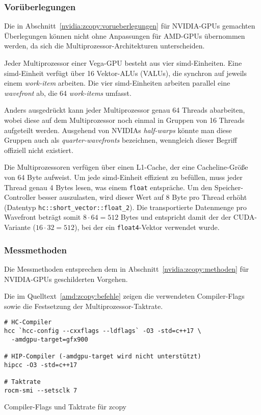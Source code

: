 \subsubsection{Vorüberlegungen}

Die in Abschnitt~\ref{nvidia:zcopy:vorueberlegungen} für NVIDIA-GPUs gemachten
Überlegungen können nicht ohne Anpassungen für AMD-GPUs übernommen werden, da
sich die Multiprozessor-Architekturen unterscheiden.

Jeder Multiprozessor einer Vega-GPU besteht aus vier \gls{simd}-Einheiten. Eine
\gls{simd}-Einheit verfügt über 16 Vektor-ALUs (VALUs), die synchron auf jeweils
einem \textit{work-item} arbeiten. Die vier \gls{simd}-Einheiten arbeiten
parallel eine \textit{wavefront} ab, die 64 \textit{work-items} umfasst.

Anders ausgedrückt kann jeder Multiprozessor genau 64 Threads abarbeiten, wobei
diese auf dem Multiprozessor noch einmal in Gruppen von 16 Threads aufgeteilt
werden. Ausgehend von NVIDIAs \textit{half-warps} könnte man diese Gruppen auch
als \textit{quarter-wavefronts} bezeichnen, wenngleich dieser Begriff offiziell
nicht existiert.

Die Multiprozessoren verfügen über einen L1-Cache, der eine Cacheline-Größe von
64 Byte aufweist. Um jede \gls{simd}-Einheit effizient zu befüllen, muss jeder
Thread genau 4 Bytes lesen, was einem \texttt{float} entspräche. Um den
Speicher-Controller besser auszulasten, wird dieser Wert auf 8 Byte pro Thread
erhöht (Datentyp \texttt{hc::short\_vector::float\_2}). Die transportierte
Datenmenge pro Wavefront beträgt somit $8 \cdot 64 = 512$ Bytes und entspricht
damit der der CUDA-Variante ($16 \cdot 32 = 512$), bei der ein
\texttt{float4}-Vektor verwendet wurde.

\subsubsection{Messmethoden}
\label{amd:zcopy:methoden}

Die Messmethoden entsprechen dem in Abschnitt~\ref{nvidia:zcopy:methoden}
für NVIDIA-GPUs geschilderten Vorgehen.

Die im Quelltext~\ref{amd:zcopy:befehle} zeigen die verwendeten Compiler-Flags
sowie die Festsetzung der Multiprozessor-Taktrate.

\begin{code}
    \begin{verbatim}
# HC-Compiler
hcc `hcc-config --cxxflags --ldflags` -O3 -std=c++17 \
  -amdgpu-target=gfx900

# HIP-Compiler (-amdgpu-target wird nicht unterstützt)
hipcc -O3 -std=c++17

# Taktrate
rocm-smi --setsclk 7
    \end{verbatim}
    \caption{Compiler-Flags und Taktrate für zcopy}
    \label{amd:zcopy:befehle}
\end{code}

